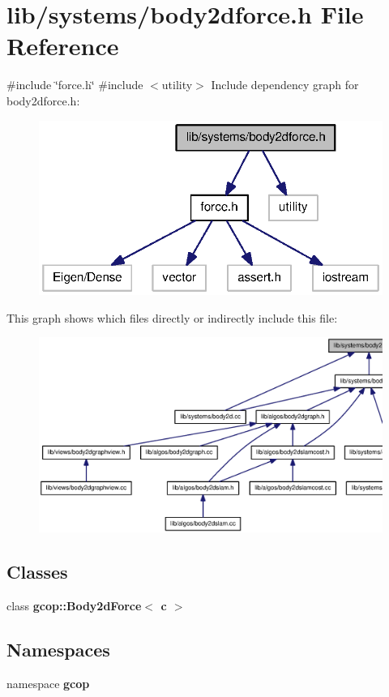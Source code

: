 \section{lib/systems/body2dforce.h \-File \-Reference}
\label{body2dforce_8h}
{\ttfamily \#include \char`\"{}force.\-h\char`\"{}}\*
{\ttfamily \#include $<$utility$>$}\*
\-Include dependency graph for body2dforce.\-h\-:
\nopagebreak
\begin{figure}[H]
\begin{center}
\leavevmode
\includegraphics[width=320pt]{body2dforce_8h__incl}
\end{center}
\end{figure}
\-This graph shows which files directly or indirectly include this file\-:
\nopagebreak
\begin{figure}[H]
\begin{center}
\leavevmode
\includegraphics[width=350pt]{body2dforce_8h__dep__incl}
\end{center}
\end{figure}
\subsection*{\-Classes}
\begin{DoxyCompactItemize}
\item 
class {\bf gcop\-::\-Body2d\-Force$<$ c $>$}
\end{DoxyCompactItemize}
\subsection*{\-Namespaces}
\begin{DoxyCompactItemize}
\item 
namespace {\bf gcop}
\end{DoxyCompactItemize}
